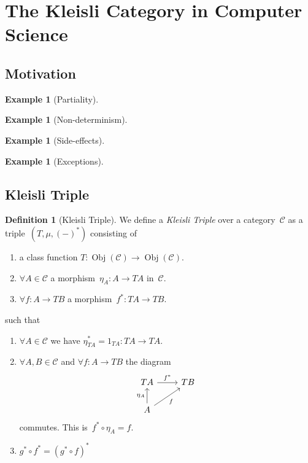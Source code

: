 \documentclass[a4paper]{article}
\theoremstyle{plain}
\newtheorem{example}[theorem]{Example}
\theoremstyle{definition}
\newtheorem{definition}[theorem]{Definition}
\DeclareMathOperator{\Obj}{Obj}
\newcommand{\cat}[1]{\mathcal{#1}}
\begin{document}
\section{The Kleisli Category in Computer Science}
\subsection{Motivation}
\begin{example}[Partiality]
\end{example}
\begin{example}[Non-determinism]
\end{example}
\begin{example}[Side-effects]
\end{example}
\begin{example}[Exceptions]
\end{example}

\subsection{Kleisli Triple}
\begin{definition}[Kleisli Triple]
    We define a \emph{Kleisli Triple} over a category~\(\cat{C}\)
    as a triple~\((T, \mu, (-)^{\ast})\) consisting of
    \begin{enumerate}
        \item a class function
            \(T:\Obj(\cat{C})\longrightarrow\Obj(\cat{C})\).
        \item \(\forall A\in\cat{C}\)
            a morphism~\(\eta_{A}:A\longrightarrow TA\)
            in~\(\cat{C}\).
        \item \(\forall f:A\longrightarrow TB\)
            a morphism~\(f^{\ast}:TA\longrightarrow TB\).
    \end{enumerate}
    such that
    \begin{enumerate}
        \item \(\forall A\in\cat{C}\) we have
            \(\eta^{\ast}_{TA} = 1_{TA}:TA\longrightarrow TA\).
        \item \(\forall A,B\in\cat{C}\)
            and \(\forall f:A\longrightarrow TB\)
            the diagram
            \[\begin{tikzcd}
                TA \arrow[r, "f^{\ast}"] & TB \\
                A \arrow[u, "\eta_{A}"] \arrow[ur, "f", swap] &
            \end{tikzcd}\]
            commutes. This is~\(f^{\ast}\circ\eta_{A} = f\).
        \item \(g^{\ast}\circ f^{\ast} = (g^{\ast}\circ f)^{\ast}\)
    \end{enumerate}
\end{definition}
\end{document}
